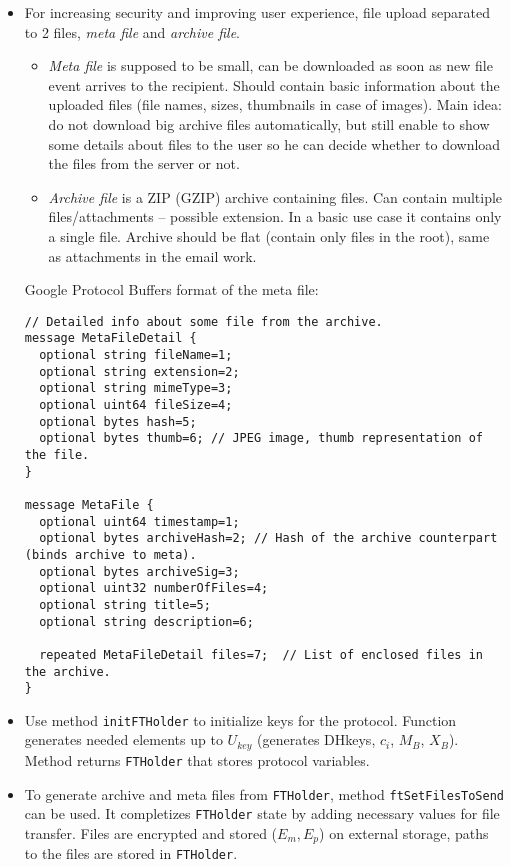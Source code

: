 \documentclass[a4paper,10pt]{article}
\begin{document}
\begin{itemize}
 \item For increasing security and improving user experience, file upload separated to 2 files, \emph{meta file} and \emph{archive file}.
    \begin{itemize}
     \item \emph{Meta file} is supposed to be small, can be downloaded as soon as new file event arrives to the recipient. Should contain
	basic information about the uploaded files (file names, sizes, thumbnails in case of images). Main idea: do not download 
	big archive files automatically, but still enable to show some details about files to the user so he can decide whether to
	download the files from the server or not. 
     \item \emph{Archive file} is a ZIP (GZIP) archive containing files. Can contain multiple files/attachments -- possible extension.
	In a basic use case it contains only a single file. Archive should be flat (contain only files in the root), same as attachments
	in the email work. 
    \end{itemize}
    \newpage
    Google Protocol Buffers format of the meta file:
    \begin{Verbatim}[frame=single]
// Detailed info about some file from the archive.
message MetaFileDetail {
  optional string fileName=1;
  optional string extension=2;
  optional string mimeType=3;
  optional uint64 fileSize=4;
  optional bytes hash=5;
  optional bytes thumb=6; // JPEG image, thumb representation of the file.
}

message MetaFile {
  optional uint64 timestamp=1;
  optional bytes archiveHash=2; // Hash of the archive counterpart (binds archive to meta).
  optional bytes archiveSig=3;
  optional uint32 numberOfFiles=4;
  optional string title=5;
  optional string description=6;
  
  repeated MetaFileDetail files=7;  // List of enclosed files in the archive.
}
    \end{Verbatim}
    
    \item Use method \texttt{initFTHolder} to initialize keys for the protocol. 
	Function generates needed elements up to $U_{key}$ (generates DHkeys, $c_i$,
	$M_B$, $X_B$). Method returns \texttt{FTHolder} that stores protocol variables.

    \item To generate archive and meta files from \texttt{FTHolder}, method \texttt{ftSetFilesToSend} can 
	be used. It completizes \texttt{FTHolder} state by adding necessary values for file transfer.
	Files are encrypted and stored ($E_m, E_p$) on external storage, paths to the files are stored in
	\texttt{FTHolder}.


\end{itemize}
\end{document}
